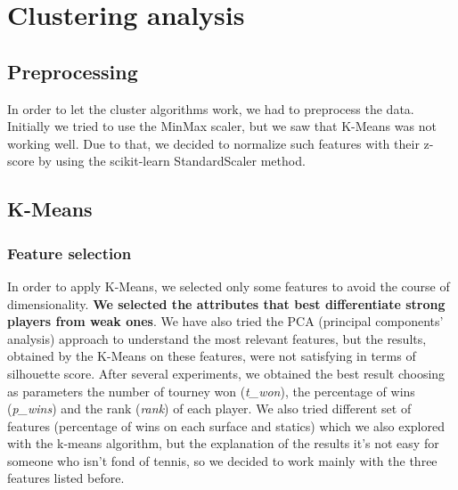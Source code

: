 \section{Clustering analysis}
\subsection{Preprocessing}
In order to let the cluster algorithms work, we had to preprocess the data. Initially we tried to use the MinMax scaler, but we saw that K-Means was not working well. Due to that, we decided to normalize such features with their z-score by using the scikit-learn StandardScaler method. 

\subsection{K-Means}
\subsubsection{Feature selection} In order to apply K-Means, we selected only some  features to avoid the course of dimensionality. \textbf{We selected the attributes that best differentiate strong players from weak ones}. We have also tried the PCA (principal components' analysis) approach to understand the most relevant features, but the results, obtained by the K-Means on these features, were not satisfying in terms of silhouette score. After several experiments, we obtained the best result choosing as parameters the number of tourney won (\textit{t\_won}), the percentage of wins (\textit{p\_wins}) and the rank (\textit{rank}) of each player.
We also tried different set of features (percentage of wins on each surface and statics) which we also explored with the k-means algorithm, but the explanation of the results it's not easy for someone who isn't fond of tennis, so we decided to work mainly with the three features listed before.

